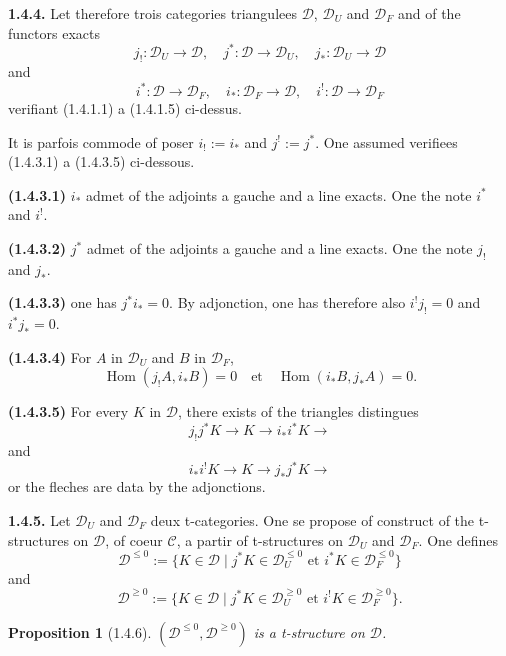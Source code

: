 \documentclass[12pt,a4paper]{article}
\theoremstyle{plain}
\newtheorem{proposition}[theorem]{Proposition}
\theoremstyle{definition}
\theoremstyle{remark}
\DeclareMathOperator{\Hom}{Hom}
\newcommand{\cC}{\mathcal{C}}
\newcommand{\cD}{\mathcal{D}}
\begin{document}
\smallskip

\noindent
\textbf{1.4.4.} Let therefore trois categories triangulees $\cD$, $\cD_{U}$ and $\cD_{F}$ and of the functors exacts
\[
j_{!} : \cD_{U} \to \cD, \quad j^{*} : \cD \to \cD_{U}, \quad j_{*} : \cD_{U} \to \cD
\]
and
\[
i^{*} : \cD \to \cD_{F}, \quad i_{*} : \cD_{F} \to \cD, \quad i^{!} : \cD \to \cD_{F}
\]
verifiant (1.4.1.1) a (1.4.1.5) ci-dessus.

It is parfois commode of poser $i_{!} := i_{*}$ and $j^{!} := j^{*}$. One assumed verifiees (1.4.3.1) a (1.4.3.5) ci-dessous.

\smallskip

\noindent
\textbf{(1.4.3.1)} $i_{*}$ admet of the adjoints a gauche and a line exacts. One the note $i^{*}$ and $i^{!}$.

\smallskip

\noindent
\textbf{(1.4.3.2)} $j^{*}$ admet of the adjoints a gauche and a line exacts. One the note $j_{!}$ and $j_{*}$.

\smallskip

\noindent
\textbf{(1.4.3.3)} one has $j^{*}i_{*} = 0$. By adjonction, one has therefore also $i^{!}j_{!} = 0$ and $i^{*}j_{*} = 0$.

\smallskip

\noindent
\textbf{(1.4.3.4)} For $A$ in $\cD_{U}$ and $B$ in $\cD_{F}$,
\[
\Hom(j_{!}A, i_{*}B) = 0 \quad \text{et} \quad \Hom(i_{*}B, j_{*}A) = 0.
\]

\smallskip

\noindent
\textbf{(1.4.3.5)} For every $K$ in $\cD$, there exists of the triangles distingues
\[
j_{!}j^{*}K \to K \to i_{*}i^{*}K \to
\]
and
\[
i_{*}i^{!}K \to K \to j_{*}j^{*}K \to
\]
or the fleches are data by the adjonctions.

\smallskip

\noindent
\textbf{1.4.5.} Let $\cD_{U}$ and $\cD_{F}$ deux t-categories. One se propose of construct of the t-structures on $\cD$, of coeur $\cC$, a partir of t-structures on $\cD_{U}$ and $\cD_{F}$. One defines
\[
\cD^{\leq 0} := \{K \in \cD \mid j^{*}K \in \cD_{U}^{\leq 0} \text{ et } i^{*}K \in \cD_{F}^{\leq 0}\}
\]
and
\[
\cD^{\geq 0} := \{K \in \cD \mid j^{*}K \in \cD_{U}^{\geq 0} \text{ et } i^{!}K \in \cD_{F}^{\geq 0}\}.
\]

\begin{proposition}[1.4.6]
$(\cD^{\leq 0}, \cD^{\geq 0})$ is a t-structure on $\cD$.
\end{proposition}

\smallskip
\end{document}
